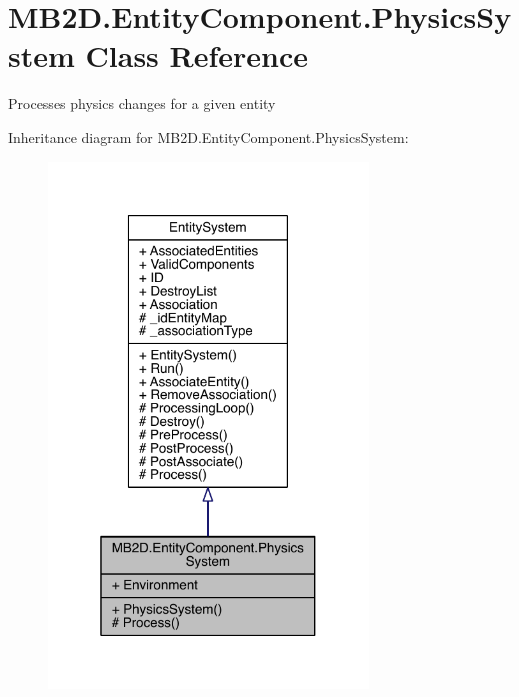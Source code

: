 \hypertarget{class_m_b2_d_1_1_entity_component_1_1_physics_system}{}\section{M\+B2\+D.\+Entity\+Component.\+Physics\+System Class Reference}
\label{class_m_b2_d_1_1_entity_component_1_1_physics_system}


Processes physics changes for a given entity  




Inheritance diagram for M\+B2\+D.\+Entity\+Component.\+Physics\+System\+:
\nopagebreak
\begin{figure}[H]
\begin{center}
\leavevmode
\includegraphics[width=241pt]{class_m_b2_d_1_1_entity_component_1_1_physics_system__inherit__graph}
\end{center}
\end{figure}


